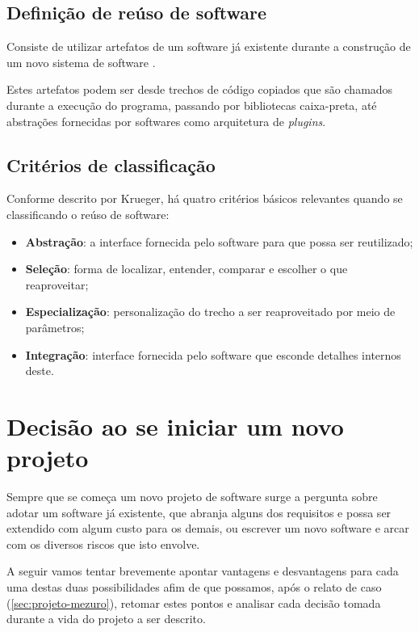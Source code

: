 \documentclass[12pt]{article}
\begin{document}
  \subsection{Definição de reúso de software} \label{subsec:definicaoreuso}
  Consiste de utilizar artefatos de um software já existente durante a construção de um novo sistema de software \cite{k92}.

  Estes artefatos podem ser desde trechos de código copiados que são chamados durante a execução do programa, passando por bibliotecas caixa-preta, até abstrações fornecidas por softwares como arquitetura de \textit{plugins}.

  \subsection{Critérios de classificação} \label{subsec:criteriosclassificacao}
  Conforme descrito por Krueger, há quatro critérios básicos relevantes quando se classificando o reúso de software:

  \begin{itemize}
    \item \textbf{Abstração}: a interface fornecida pelo software para que possa ser reutilizado;
    \item \textbf{Seleção}: forma de localizar, entender, comparar e escolher o que reaproveitar;
    \item \textbf{Especialização}: personalização do trecho a ser reaproveitado por meio de parâmetros;
    \item \textbf{Integração}: interface fornecida pelo software que esconde detalhes internos deste.
  \end{itemize}

\section{Decisão ao se iniciar um novo projeto} \label{sec:decisao}
Sempre que se começa um novo projeto de software surge a pergunta sobre adotar um software já existente, que abranja alguns dos requisitos e possa ser extendido com algum custo para os demais, ou escrever um novo software e arcar com os diversos riscos que isto envolve.

A seguir vamos tentar brevemente apontar vantagens e desvantagens para cada uma destas duas possibilidades afim de que possamos, após o relato de caso (\ref{sec:projeto-mezuro}), retomar estes pontos e analisar cada decisão tomada durante a vida do projeto a ser descrito.
\end{document}
